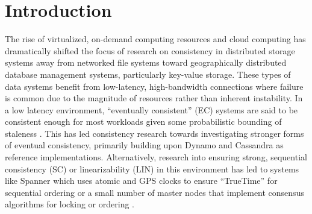 \documentclass{article}
\begin{document}
\newpage
\thispagestyle{empty}
\mbox{}

\newpage
\setcounter{tocdepth}{3}
\tableofcontents

\newpage
\listoffigures

\newpage
\onehalfspacing

\section{Introduction}
\label{sec:introduction}

The rise of virtualized, on-demand computing resources and cloud
computing has dramatically shifted the focus of research on
consistency in distributed storage systems away from networked file
systems toward geographically distributed database management systems,
particularly key-value storage.
These types of data systems benefit from low-latency, high-bandwidth
connections where failure is common due to the magnitude of resources
rather than inherent instability.
In a low latency environment, ``eventually consistent'' (EC)
\cite{vogels_eventually_2009} systems are said to be consistent enough
for most workloads given some probabilistic bounding of staleness
\cite{bailis_quantifying_2014,bermbach_eventual_2011,bailis_probabilistically_2012}.
This has led consistency research towards investigating stronger forms
of eventual consistency, primarily building upon Dynamo
\cite{decandia_dynamo:_2007} and Cassandra
\cite{lakshman_cassandra:_2010} as reference implementations.
Alternatively, research into ensuring strong, sequential consistency
(SC) or linearizability (LIN) in this environment has led to systems
like Spanner \cite{corbett_spanner:_2013} which uses atomic and GPS
clocks to ensure ``TrueTime'' for sequential ordering or a small
number of master nodes that implement consensus algorithms
\cite{lamport_paxos_2001,ongaro_search_2014} for locking or ordering
\cite{kraska_mdcc:_2013}.
\end{document}

